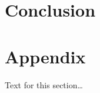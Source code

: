 \documentclass{bmcart}
\begin{document}

\section{Conclusion}

  
\newpage


\section*{Appendix}
Text for this section\ldots

\end{document}
